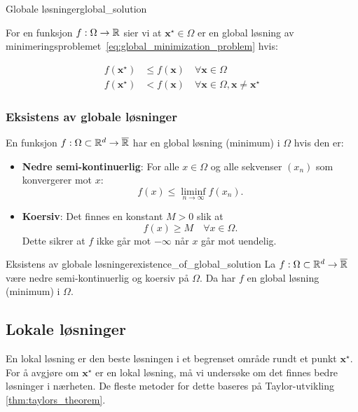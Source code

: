 \begin{definition}{Globale løsninger}{global_solution}

	\medskip
	For en funksjon \(f: \Omega \to \mathbb{R}\) sier vi at \(\symbf{x}^\star \in \Omega\) er en global løsning av minimeringsproblemet~\eqref{eq:global_minimization_problem} hvis:

	\begin{align*}
		f(\symbf{x}^\star) & \leq f(\symbf{x}) \quad \forall \symbf{x} \in \Omega \tag{Global}                                      \\
		f(\symbf{x}^\star) & < f(\symbf{x}) \quad \forall \symbf{x} \in \Omega, \symbf{x} \neq \symbf{x}^\star \tag{Strengt Global}
	\end{align*}
\end{definition}

\subsubsection{Eksistens av globale løsninger}

En funksjon \(f: \Omega \subset \mathbb{R}^d \to \overline{\mathbb{R}}\) har en global løsning (minimum) i \(\Omega\) hvis den er:

\begin{itemize}
	\item \textbf{Nedre semi-kontinuerlig}: For alle \(x \in \Omega\) og alle sekvenser \((x_n)\) som konvergerer mot \(x\):
	      \[
		      f(x) \leq \liminf_{n \to \infty} f(x_n).
	      \]
	\item \textbf{Koersiv}: Det finnes en konstant \(M > 0\) slik at
	      \[
		      f(x) \geq M \quad \forall x \in \Omega.
	      \]
	      Dette sikrer at \(f\) ikke går mot \(-\infty\) når \(x\) går mot uendelig.
\end{itemize}

\begin{theorem}{Eksistens av globale løsninger}{existence_of_global_solution}
	La \(f: \Omega \subset \mathbb{R}^d \to \overline{\mathbb{R}}\) være nedre semi-kontinuerlig og koersiv på \(\Omega\). Da har \(f\) en global løsning (minimum) i \(\Omega\).
\end{theorem}

\subsection{Lokale løsninger}
En lokal løsning er den beste løsningen i et begrenset område rundt et punkt \(\symbf{x}^\star\).
For å avgjøre om \(\symbf{x}^\star\) er en lokal løsning, må vi undersøke om det finnes bedre løsninger i nærheten.
De fleste metoder for dette baseres på Taylor-utvikling \ref{thm:taylors_theorem}.


